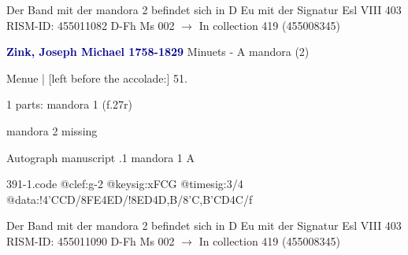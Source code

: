 \documentclass[twocolumn]{book}
\begin{document}
\newline Der Band mit der mandora 2 befindet sich in D Eu mit der Signatur Esl VIII 403
\newline RISM-ID: 455011082
\newline D-Fh  Ms 002
\newline $\rightarrow$ In collection 419 (455008345)
      
\newline \par \vspace{7pt} \textcolor{darkblue}{\textbf{Zink, Joseph Michael  1758-1829}}
\newline Minuets - A
\newline mandora (2)
\newline \begin{itshape}[f.27r, at left:] Menue | [left before the accolade:] 51.\end{itshape} 
\newline \textcolor{darkblue}{}  1 parts: mandora 1  (f.27r)
\newline \begin{small} mandora 2 missing\end{small} 
\newline Autograph manuscript
.1  mandora 1  A  
\begin{filecontents*}{391-1.code}
@clef:g-2
@keysig:xFCG
@timesig:3/4
@data:!4'CCD/{8FE}4ED/!{8ED}4D,B/{8'C,B}{'CD}4C/f
\end{filecontents*}
\newline
%

\newline Der Band mit der mandora 2 befindet sich in D Eu mit der Signatur Esl VIII 403
\newline RISM-ID: 455011090
\newline D-Fh  Ms 002
\newline $\rightarrow$ In collection 419 (455008345)
      
\end{document}
